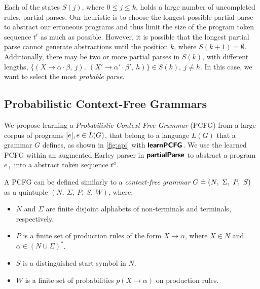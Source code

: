  Each of the states $S(j)$, where $0
\leq j \leq k$, holds a large number of uncompleted rules, \ie partial parses.
Our heuristic is to choose the longest possible partial parse to abstract our
erroneous programs and thus limit the size of the program token sequence $t^i$
as much as possible. However, it is possible that the longest partial parse
cannot generate abstractions until the position $k$, where $S(k + 1) =
\emptyset$. Additionally, there may be two or more partial parses in $S(k)$,
with different lengths, \eg $\{(X \rightarrow \alpha \cdot \beta,\ j),\ (X'
\rightarrow \alpha' \cdot \beta',\ h)\} \in S(k),\ j \neq h$. In this case, we
want to select the most \emph{probable parse}.



\subsection{Probabilistic Context-Free Grammars}
\label{sec:prog-abstract:pcfg}
We propose learning a \emph{Probabilistic Context-Free Grammar} (PCFG) from a
large corpus of programs $[e], e \in L(G)$, that belong to a language
$L(G)$ that a grammar $G$ defines, as shown in \autoref{fig:api} with
$\bm{\mathsf{learnPCFG}}$. We use the learned PCFG within an augmented Earley parser in
$\bm{\mathsf{partialParse}}$ to abstract a program $e_{\bot}$ into a abstract token sequence
$t^a$.

A PCFG can be defined similarly to a \emph{context-free grammar} $G \doteq (N,\
\Sigma,\ P,\ S)$ as a quintuple $(N,\ \Sigma,\ P,\ S,\ W)$, where:
\begin{itemize}
    \item $N$ and $\Sigma$ are finite disjoint alphabets of non-terminals and
    terminals, respectively.
    \item $P$ is a finite set of production rules of the form $X \rightarrow
    \alpha$, where $X \in N$ and $\alpha \in (N \cup \Sigma)^{\ast}$.
    \item $S$ is a distinguished start symbol in $N$.
    \item $W$ is a finite set of probabilities $p(X \rightarrow \alpha)$ on
    production rules.
\end{itemize}

